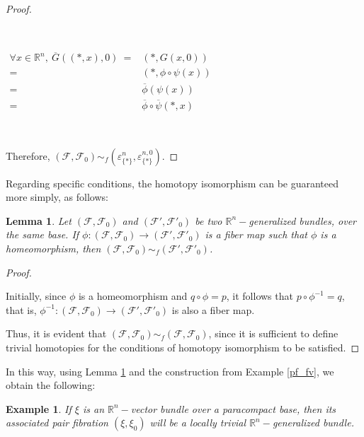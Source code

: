 \documentclass[12pt,oneside]{book}
\newtheorem{ex}     {Example}[chapter]
\newtheorem{lem}    {Lemma}[chapter]
\newcommand{\R}{\mathbb{R}}
\begin{document}
\begin{proof}
        \

        \

        $\begin{array}{rl}
            \forall x\in \R^{n}, \ \overline{G}((*,x),0) \ = & (*,G(x,0)) \\
            = & (*,\phi\circ\psi(x)) \\
            = & \overline{\phi}(\psi(x)) \\
            = & \overline{\phi}\circ\overline{\psi}(*,x)
        \end{array}$

        \
    
        Therefore, $(\mathcal{F},\mathcal{F}_{0})\sim_{f}(\varepsilon^{n}_{\{ * \}},\varepsilon^{n,0}_{\{ * \}})$.
    
    \end{proof}

    Regarding specific conditions, the homotopy isomorphism can be guaranteed more simply, as follows:

    \begin{lem}\label{iso_homot}
        Let $(\mathcal{F},\mathcal{F}_{0})$ and $(\mathcal{F'},\mathcal{F'}_{0})$ be two $\R^{n}-$generalized bundles, over the same base. 
        If $\phi:(\mathcal{F},\mathcal{F}_{0})\to (\mathcal{F'},\mathcal{F'}_{0})$ is a fiber map such that $\phi$ is a 
        homeomorphism, then $(\mathcal{F},\mathcal{F}_{0})\sim_{f} (\mathcal{F'},\mathcal{F'}_{0})$.
    \end{lem}
    \begin{proof}
    
        \
        
        Initially, since $\phi$ is a homeomorphism and $q\circ\phi=p$, it follows that $p\circ\phi^{-1}=q$, that is, 
        $\phi^{-1}:(\mathcal{F},\mathcal{F}_{0})\to (\mathcal{F'},\mathcal{F'}_{0})$ is also a fiber map.
        
        Thus, it is evident that $(\mathcal{F},\mathcal{F}_{0})\sim_{f} (\mathcal{F},\mathcal{F}_{0})$, since it is sufficient to define 
        trivial homotopies for the conditions of homotopy isomorphism to be satisfied.
        
    \end{proof}
    
    In this way, using Lemma \ref{iso_homot} and the construction from Example \ref{pf_fv}, we obtain the following:
    
    \begin{ex}\label{fht_fv}
        If $\xi$ is an $\R^{n}-$vector bundle over a paracompact base, then its associated pair 
        fibration $(\xi,\xi_{0})$ will be a locally trivial $\R^{n}-$generalized bundle.
    \end{ex}
    
\end{document}
